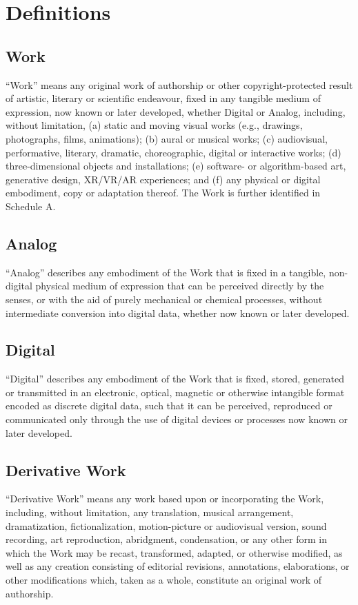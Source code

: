 \section{Definitions}


\subsection{Work}
\enquote{Work} means any original work of authorship or other 
copyright-protected result of artistic, literary or scientific endeavour, fixed 
in any tangible medium of expression, now known or later developed, whether 
Digital or Analog, including, without limitation, 
(a) static and moving visual works (e.g., drawings, photographs, films, animations); 
(b) aural or musical works; 
(c) audiovisual, performative, literary, dramatic, choreographic, digital or interactive works; 
(d) three-dimensional objects and installations; 
(e) software- or algorithm-based art, generative design, XR/VR/AR experiences; and 
(f) any physical or digital embodiment, copy or adaptation thereof.
The Work is further identified in Schedule A.


\subsection{Analog}
\enquote{Analog} describes any embodiment of the Work that is fixed in a 
tangible, non-digital physical medium of expression that can be perceived 
directly by the senses, or with the aid of purely mechanical or chemical 
processes, without intermediate conversion into digital data, whether now known 
or later developed.


\subsection{Digital}
\enquote{Digital} describes any embodiment of the Work that is fixed, stored, 
generated or transmitted in an electronic, optical, magnetic or otherwise 
intangible format encoded as discrete digital data, such that it can be 
perceived, reproduced or communicated only through the use of digital devices or 
processes now known or later developed.


\subsection{Derivative Work}
\enquote{Derivative Work} means any work based upon or incorporating the Work, 
including, without limitation, any translation, musical arrangement, 
dramatization, fictionalization, motion-picture or audiovisual version, sound 
recording, art reproduction, abridgment, condensation, or any other form in 
which the Work may be recast, transformed, adapted, or otherwise modified, as 
well as any creation consisting of editorial revisions, annotations, 
elaborations, or other modifications which, taken as a whole, constitute an 
original work of authorship.


